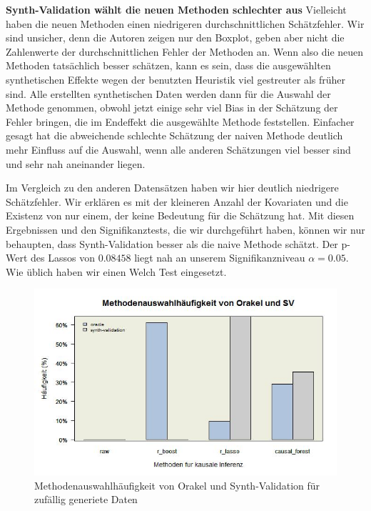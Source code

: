 \documentclass[12pt,a4paper,twoside]{scrartcl}
\numberwithin{equation}{section}
\begin{document}
\noindent
\textbf{Synth-Validation wählt die neuen Methoden schlechter aus} Vielleicht haben die neuen Methoden einen niedrigeren durchschnittlichen Schätzfehler. Wir sind unsicher, denn die Autoren zeigen nur den Boxplot, geben aber nicht die Zahlenwerte der durchschnittlichen Fehler der Methoden an. Wenn also die neuen Methoden tatsächlich besser schätzen, kann es sein, dass die ausgewählten synthetischen Effekte wegen der benutzten Heuristik viel gestreuter als früher sind. Alle erstellten synthetischen Daten werden dann für die Auswahl der Methode genommen, obwohl jetzt einige sehr viel Bias in der Schätzung der Fehler bringen, die im Endeffekt die ausgewählte Methode feststellen. Einfacher gesagt hat die abweichende schlechte Schätzung der naiven Methode deutlich mehr Einfluss auf die Auswahl, wenn alle anderen Schätzungen viel besser sind und sehr nah aneinander liegen. 
\par

\noindent
Im Vergleich zu den anderen Datensätzen haben wir hier deutlich niedrigere Schätzfehler. Wir erklären es mit der kleineren Anzahl der Kovariaten und die Existenz von nur einem, der keine Bedeutung für die Schätzung hat. Mit diesen Ergebnissen und den Signifikanztests, die wir durchgeführt haben, können wir nur behaupten, dass Synth-Validation besser als die naive Methode schätzt. Der p-Wert des Lassos von $0.08458$ liegt nah an unserem Signifikanzniveau $\alpha=0.05$. Wie üblich haben wir einen Welch Test eingesetzt.\par

\begin{center}
\begin{figure}[h]
    \centering
    \includegraphics[height=0.5\textwidth, width=1\textwidth]{figures/plots/randomBarplot.jpeg}
    \caption[Methodenauswahlhäufigkeit von Orakel und Synth-Validation für zufällig generiete Daten]{Methodenauswahlhäufigkeit von Orakel und Synth-Validation für zufällig generiete Daten}\label{fig:randomBarplot}
  \end{figure}
\end{center}
\end{document}
